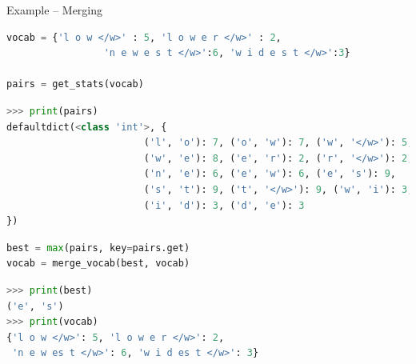 
\begin{vbframe}{Example -- Merging}

\vspace{-.5cm}

\begin{lstlisting}[language=Python]
vocab = {'l o w </w>' : 5, 'l o w e r </w>' : 2, 
				 'n e w e s t </w>':6, 'w i d e s t </w>':3}

pairs = get_stats(vocab)
\end{lstlisting}

\vspace{-.75cm}

\begin{lstlisting}[language=Python]
>>> print(pairs)
defaultdict(<class 'int'>, {
						('l', 'o'): 7, ('o', 'w'): 7, ('w', '</w>'): 5, 
						('w', 'e'): 8, ('e', 'r'): 2, ('r', '</w>'): 2, 
						('n', 'e'): 6, ('e', 'w'): 6, ('e', 's'): 9, 
						('s', 't'): 9, ('t', '</w>'): 9, ('w', 'i'): 3, 
						('i', 'd'): 3, ('d', 'e'): 3
})
\end{lstlisting}

\vspace{-.5cm}

\begin{lstlisting}[language=Python]
best = max(pairs, key=pairs.get)
vocab = merge_vocab(best, vocab)
\end{lstlisting}

\vspace{-.75cm}

\begin{lstlisting}[language=Python]
>>> print(best)
('e', 's')
>>> print(vocab)
{'l o w </w>': 5, 'l o w e r </w>': 2, 
 'n e w es t </w>': 6, 'w i d es t </w>': 3}
\end{lstlisting}

\end{vbframe}


